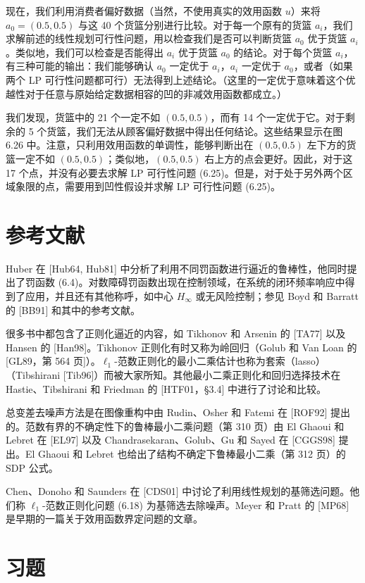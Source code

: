 \documentclass[UTF8,12pt,a4paper,fontset=fandol]{ctexart}
\begin{document}
现在，我们利用消费者偏好数据（当然，不使用真实的效用函数 $u$）来将 $a_0=(0.5,0.5)$ 与这 40 个货篮分别进行比较。对于每一个原有的货篮 $a_i$，我们求解前述的线性规划可行性问题，用以检查我们是否可以判断货篮 $a_0$ 优于货篮 $a_i$。类似地，我们可以检查是否能得出 $a_i$ 优于货篮 $a_0$ 的结论。对于每个货篮 $a_i$，有三种可能的输出：我们能够确认 $a_0$ 一定优于 $a_i$，$a_i$ 一定优于 $a_0$，或者（如果两个 LP 可行性问题都可行）无法得到上述结论。（这里的一定优于意味着这个优越性对于任意与原始给定数据相容的凹的非减效用函数都成立。）

我们发现，货篮中的 21 个一定不如 $(0.5,0.5)$，而有 14 个一定优于它。对于剩余的 5 个货篮，我们无法从顾客偏好数据中得出任何结论。这些结果显示在图 6.26 中。注意，只利用效用函数的单调性，能够判断出在 $(0.5,0.5)$ 左下方的货篮一定不如 $(0.5,0.5)$；类似地，$(0.5,0.5)$ 右上方的点会更好。因此，对于这 17 个点，并没有必要去求解 LP 可行性问题 (6.25)。但是，对于处于另外两个区域象限的点，需要用到凹性假设并求解 LP 可行性问题 (6.25)。

\section*{参考文献}

Huber 在 [Hub64, Hub81] 中分析了利用不同罚函数进行逼近的鲁棒性，他同时提出了罚函数 (6.4)。对数障碍罚函数出现在控制领域，在系统的闭环频率响应中得到了应用，并且还有其他称呼，如中心 $H_\infty$ 或无风险控制；参见 Boyd 和 Barratt 的 [BB91] 和其中的参考文献。

很多书中都包含了正则化逼近的内容，如 Tikhonov 和 Arsenin 的 [TA77] 以及 Hansen 的 [Han98]。Tikhonov 正则化有时又称为岭回归（Golub 和 Van Loan 的 [GL89，第 564 页]）。$\ell_1$-范数正则化的最小二乘估计也称为套索（lasso）（Tibshirani [Tib96]）而被大家所知。其他最小二乘正则化和回归选择技术在 Hastie、Tibshirani 和 Friedman 的 [HTF01，\S3.4] 中进行了讨论和比较。

总变差去噪声方法是在图像重构中由 Rudin、Osher 和 Fatemi 在 [ROF92] 提出的。范数有界的不确定性下的鲁棒最小二乘问题（第 310 页）由 El Ghaoui 和 Lebret 在 [EL97] 以及 Chandrasekaran、Golub、Gu 和 Sayed 在 [CGGS98] 提出。El Ghaoui 和 Lebret 也给出了结构不确定下鲁棒最小二乘（第 312 页）的 SDP 公式。

Chen、Donoho 和 Saunders 在 [CDS01] 中讨论了利用线性规划的基筛选问题。他们称 $\ell_1$-范数正则化问题 (6.18) 为基筛选去除噪声。Meyer 和 Pratt 的 [MP68] 是早期的一篇关于效用函数界定问题的文章。

\section*{习题}
\end{document}
